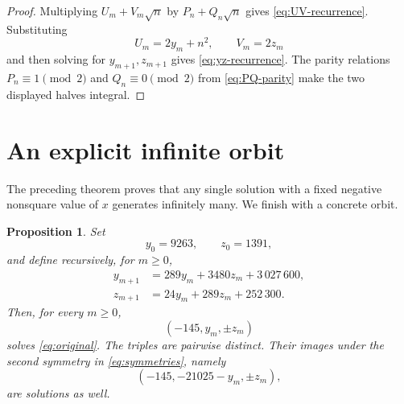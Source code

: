 \documentclass[a4paper,11pt]{amsart}
\newtheorem{proposition}[proposition]{Proposition}
\theoremstyle{definition}
\theoremstyle{remark}
\begin{document}
\begin{proof}
Multiplying $U_m+V_m\sqrt n$ by $P_n+Q_n\sqrt n$ gives \eqref{eq:UV-recurrence}.  Substituting
\[
U_m=2y_m+n^2,
\qquad V_m=2z_m
\]
and then solving for $y_{m+1},z_{m+1}$ gives \eqref{eq:yz-recurrence}.  The parity relations $P_n\equiv1\pmod2$ and $Q_n\equiv0\pmod2$ from \eqref{eq:PQ-parity} make the two displayed halves integral.
\end{proof}

\section{An explicit infinite orbit}

The preceding theorem proves that any single solution with a fixed negative nonsquare value of $x$ generates infinitely many.  We finish with a concrete orbit.

\begin{proposition}\label{prop:explicit-orbit}
Set
\[
y_0=9263,
\qquad z_0=1391,
\]
and define recursively, for $m\ge0$,
\begin{equation}\label{eq:explicit-recurrence}
\begin{aligned}
y_{m+1}&=289y_m+3480z_m+3\,027\,600,\\
z_{m+1}&=24y_m+289z_m+252\,300.
\end{aligned}
\end{equation}
Then, for every $m\ge0$,
\begin{equation}\label{eq:explicit-family}
(-145,y_m,\pm z_m)
\end{equation}
solves \eqref{eq:original}.  The triples are pairwise distinct.  Their images under the second symmetry in \eqref{eq:symmetries}, namely
\begin{equation}\label{eq:explicit-symmetric-family}
(-145,-21025-y_m,\pm z_m),
\end{equation}
are solutions as well.
\end{proposition}
\end{document}
